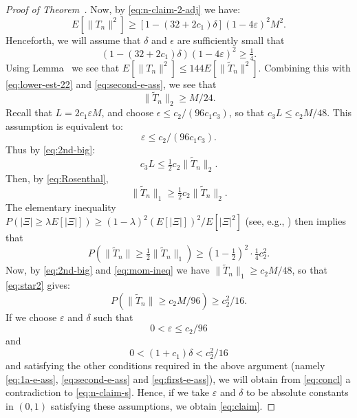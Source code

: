 \documentclass[12pt]{amsart}
\def\e{\varepsilon}
\def\half{{\tfrac12}}
\def\upref#1{\upn{\ref{#1}}}
\theoremstyle{definition}
\theoremstyle{plain}
\theoremstyle{remark}
\begin{document}
\begin{proof}[Proof of Theorem~\upref{th:main}]
Now, by \eqref{eq:n-claim-2-adj} we have:
\begin{equation}\label{eq:lower-est-22}
   E[\|T_n\|^2]\ge [1-(32+2c_1)\delta](1-4\e)^2M^2.
\end{equation}
Henceforth, we will assume that $\delta$ and $\epsilon$ are sufficiently
small that
\begin{equation}\label{eq:second-e-ass}
        (1-(32+2c_1)\delta)(1-4\e)^2 \ge \tfrac14.
\end{equation}
Using Lemma~\upref{lem:comp-moment} we see that
$E[\|T_n\|^2] \le 144 E[\| \tilde T_n \|^2]$.  Combining this with
\eqref{eq:lower-est-22} and \eqref{eq:second-e-ass}, we see that
\begin{equation}\label{eq:2nd-big}
        \|\tilde T_n\|_2\ge M/24.
\end{equation}
Recall that $L=2c_1\e M$, and choose $\epsilon\le c_2/(96 c_1 c_3)$,
so that $c_3 L \le c_2 M/48$.
This assumption is equivalent to:
\begin{equation}\label{eq:first-e-ass}
        \e\le c_2/(96 c_1 c_3).
\end{equation}
Thus by \eqref{eq:2nd-big}:
\begin{equation}\label{eq:L-small}
  c_3 L \le \tfrac12 c_2 \|\tilde T_n\|_2.
\end{equation}
Then, by \eqref{eq:Rosenthal},
\begin{equation}\label{eq:mom-ineq}
  \|\tilde T_n\|_1 \ge 
  \tfrac12c_2 \|\tilde T_n\|_2.
\end{equation}
The elementary inequality $P(|\Xi|\ge\lambda E[|\Xi|])\ge (1-\lambda)^2
(E[|\Xi|])^2/E[|\Xi|^2]$ (see, e.g., \cite[Exercise 3.3.11]{Chung}) then
implies that
\begin{equation}\label{eq:star2}
  P(\|\tilde T_n\|\ge \half \|\tilde T_n\|_1)
   \ge (1-\half)^2\cdot \tfrac14 c_2^2.
\end{equation}
Now, by \eqref{eq:2nd-big} and
\eqref{eq:mom-ineq} we have $\|\tilde T_n\|_1\ge 
c_2M/48$, so
that \eqref{eq:star2} gives:
\begin{equation}\label{eq:concl}
  P(\|\tilde T_n\|\ge c_2 M/96)
    \ge c_2^2/16.
\end{equation}
If we choose $\e$ and $\delta$ such that
\begin{equation}\label{eq:third-e-ass}
        0<\e\le c_2/96
\end{equation}
and
\begin{equation}\label{eq:fourth-e-ass}
0<(1+c_1)\delta<c_2^2/16
\end{equation}
and satisfying the
other conditions required in the above argument (namely
\eqref{eq:1a-e-ass}, \eqref{eq:second-e-ass} and \eqref{eq:first-e-ass}),
we will obtain from \eqref{eq:concl} a
contradiction to \eqref{eq:n-claim-s}.
Hence, if we take $\e$ and $\delta$ to be absolute constants in $(0,1)$
satisfying these assumptions, we obtain \eqref{eq:claim}.


\end{proof}
\end{document}

